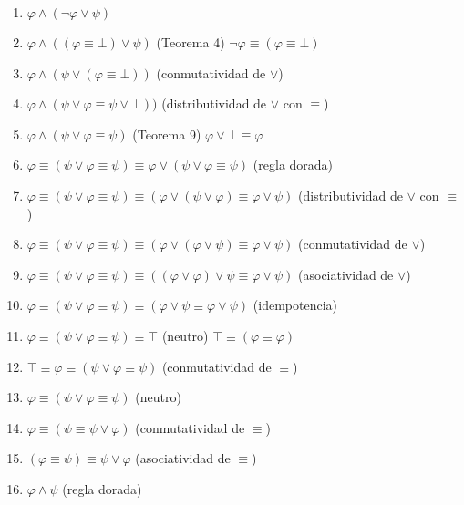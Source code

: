 \begin{enumerate}
    \item $\varphi \land (\neg\varphi \lor \psi)$
    \item $\varphi \land ((\varphi \equiv \bot)  \lor \psi)$ \hfill (Teorema 4) $\neg\varphi \equiv (\varphi \equiv \bot)$
    \item $\varphi \land (\psi \lor (\varphi \equiv \bot))$ \hfill (conmutatividad de $\lor$)
    \item $\varphi \land (\psi \lor \varphi \equiv \psi \lor \bot))$ \hfill (distributividad de $\lor$ con $\equiv$)
    \item $\varphi \land (\psi \lor \varphi \equiv \psi)$ \hfill (Teorema 9) $\varphi \lor \bot \equiv \varphi$
    \item $\varphi \equiv (\psi \lor \varphi \equiv \psi) \equiv \varphi \lor (\psi \lor \varphi \equiv \psi)$ \hfill (regla dorada)
    \item $\varphi \equiv (\psi \lor \varphi \equiv \psi) \equiv (\varphi \lor (\psi \lor \varphi) \equiv \varphi \lor \psi)$ \hfill (distributividad de $\lor$ con $\equiv$)
    \item $\varphi \equiv (\psi \lor \varphi \equiv \psi) \equiv (\varphi \lor (\varphi \lor \psi) \equiv \varphi \lor \psi)$ \hfill (conmutatividad de $\lor$)
    \item $\varphi \equiv (\psi \lor \varphi \equiv \psi) \equiv ((\varphi \lor \varphi) \lor \psi \equiv \varphi \lor \psi)$ \hfill (asociatividad de $\lor$)
    \item $\varphi \equiv (\psi \lor \varphi \equiv \psi) \equiv (\varphi \lor \psi \equiv \varphi \lor \psi)$ \hfill (idempotencia)

    \item $\varphi \equiv (\psi \lor \varphi \equiv \psi) \equiv \top$ \hfill (neutro) $\top \equiv (\varphi \equiv \varphi)$

    \item $\top \equiv \varphi \equiv (\psi \lor \varphi \equiv \psi)$ \hfill (conmutatividad de $\equiv$)

    \item $\varphi \equiv (\psi \lor \varphi \equiv \psi)$ \hfill (neutro)
    \item $\varphi \equiv (\psi \equiv \psi \lor \varphi)$ \hfill (conmutatividad de $\equiv$)
    \item $(\varphi \equiv \psi) \equiv \psi \lor \varphi$ \hfill (asociatividad de $\equiv$)
    \item $\varphi \land \psi$ \hfill (regla dorada)

\end{enumerate}

